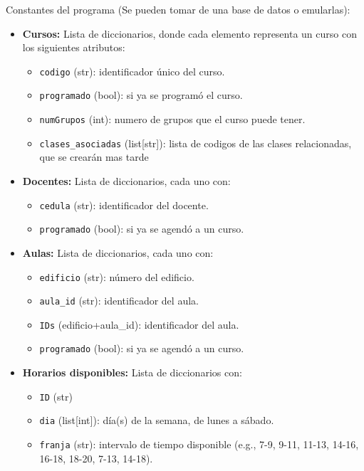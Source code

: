 \documentclass{article}
\begin{document}
Constantes del programa (Se pueden tomar de una base de datos o emularlas):
\begin{itemize}
  \item \textbf{Cursos:} Lista de diccionarios, donde cada elemento representa un curso con los siguientes atributos:
    \begin{itemize}
      \item \texttt{codigo} (str): identificador único del curso.
      \item \texttt{programado} (bool): si ya se programó el curso.
      \item \texttt{numGrupos} (int): numero de grupos que el curso puede tener.
      \item \texttt{clases\_asociadas} (list[str]): lista de codigos de las clases 
            relacionadas, que se crearán mas tarde
    \end{itemize}
    
  \item \textbf{Docentes:} Lista de diccionarios, cada uno con:
    \begin{itemize}
      \item \texttt{cedula} (str): identificador del docente.
      \item \texttt{programado} (bool): si ya se agendó a un curso.
    \end{itemize}

  \item \textbf{Aulas:} Lista de diccionarios, cada uno con:
    \begin{itemize}
      \item \texttt{edificio} (str): número del edificio.
      \item \texttt{aula\_id} (str): identificador del aula.
      \item \texttt{IDs} (edificio+aula\_id): identificador del aula.
      \item \texttt{programado} (bool): si ya se agendó a un curso.
    \end{itemize}

  \item \textbf{Horarios disponibles:} Lista de diccionarios con:
    \begin{itemize}
      \item \texttt{ID} (str)
      \item \texttt{dia} (list[int]): día(s) de la semana, de lunes a sábado.
      \item \texttt{franja} (str): intervalo de tiempo disponible 
            (e.g., 7-9, 9-11, 11-13, 14-16, 16-18, 18-20, 7-13, 14-18).
    \end{itemize}
\end{itemize}
\end{document}
